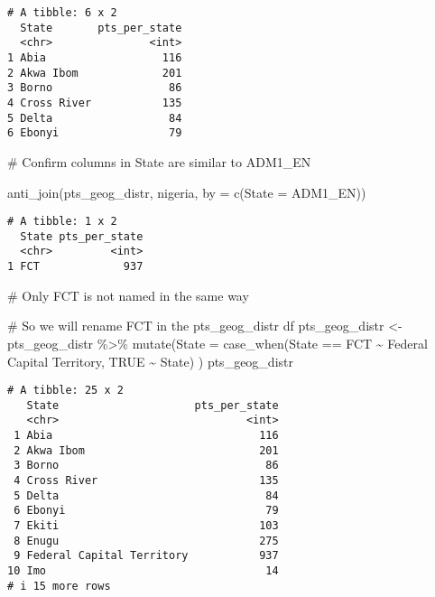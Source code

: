 \documentclass[
  letterpaper,
  DIV=11,
  numbers=noendperiod]{scrartcl}
\newenvironment{Shaded}{\begin{snugshade}}{\end{snugshade}}
\newcommand{\AttributeTok}[1]{\textcolor[rgb]{0.40,0.45,0.13}{#1}}
\newcommand{\CommentTok}[1]{\textcolor[rgb]{0.37,0.37,0.37}{#1}}
\newcommand{\ConstantTok}[1]{\textcolor[rgb]{0.56,0.35,0.01}{#1}}
\newcommand{\FunctionTok}[1]{\textcolor[rgb]{0.28,0.35,0.67}{#1}}
\newcommand{\NormalTok}[1]{\textcolor[rgb]{0.00,0.23,0.31}{#1}}
\newcommand{\OtherTok}[1]{\textcolor[rgb]{0.00,0.23,0.31}{#1}}
\newcommand{\SpecialCharTok}[1]{\textcolor[rgb]{0.37,0.37,0.37}{#1}}
\newcommand{\StringTok}[1]{\textcolor[rgb]{0.13,0.47,0.30}{#1}}
\begin{document}
\begin{verbatim}
# A tibble: 6 x 2
  State       pts_per_state
  <chr>               <int>
1 Abia                  116
2 Akwa Ibom             201
3 Borno                  86
4 Cross River           135
5 Delta                  84
6 Ebonyi                 79
\end{verbatim}

\begin{Shaded}
\begin{Highlighting}[]
\CommentTok{\# Confirm columns in State are similar to ADM1\_EN}

\FunctionTok{anti\_join}\NormalTok{(pts\_geog\_distr, nigeria, }\AttributeTok{by =} \FunctionTok{c}\NormalTok{(}\StringTok{\textquotesingle{}State\textquotesingle{}} \OtherTok{=} \StringTok{\textquotesingle{}ADM1\_EN\textquotesingle{}}\NormalTok{))}
\end{Highlighting}
\end{Shaded}

\begin{verbatim}
# A tibble: 1 x 2
  State pts_per_state
  <chr>         <int>
1 FCT             937
\end{verbatim}

\begin{Shaded}
\begin{Highlighting}[]
\CommentTok{\# Only FCT is not named in the same way}

\CommentTok{\# So we will rename FCT in the pts\_geog\_distr df}
\NormalTok{pts\_geog\_distr }\OtherTok{\textless{}{-}}\NormalTok{ pts\_geog\_distr }\SpecialCharTok{\%\textgreater{}\%} 
  \FunctionTok{mutate}\NormalTok{(}\AttributeTok{State =} \FunctionTok{case\_when}\NormalTok{(State }\SpecialCharTok{==} \StringTok{\textquotesingle{}FCT\textquotesingle{}} \SpecialCharTok{\textasciitilde{}} \StringTok{\textquotesingle{}Federal Capital Territory\textquotesingle{}}\NormalTok{,}
                           \ConstantTok{TRUE} \SpecialCharTok{\textasciitilde{}}\NormalTok{ State)}
\NormalTok{         )}
\NormalTok{pts\_geog\_distr}
\end{Highlighting}
\end{Shaded}

\begin{verbatim}
# A tibble: 25 x 2
   State                     pts_per_state
   <chr>                             <int>
 1 Abia                                116
 2 Akwa Ibom                           201
 3 Borno                                86
 4 Cross River                         135
 5 Delta                                84
 6 Ebonyi                               79
 7 Ekiti                               103
 8 Enugu                               275
 9 Federal Capital Territory           937
10 Imo                                  14
# i 15 more rows
\end{verbatim}
\end{document}
